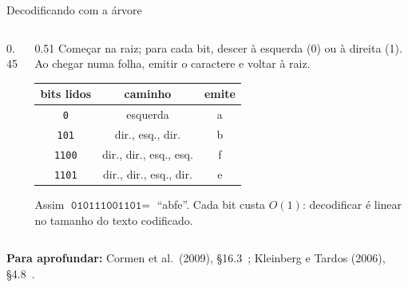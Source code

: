 \documentclass[aspectratio=169,xcolor=table]{beamer}
\newcommand{\zero}{edge from parent node[bit, left] {0}}
\newcommand{\um}{edge from parent node[bit, right] {1}}
\newcommand{\fonte}[1]{%
  \vfill
  {\tiny\color{gray!55!black}\textbf{Para aprofundar:} #1\par}%
}
\begin{document}
\begin{frame}{Decodificando com a árvore}
  \begin{columns}[c]
    \begin{column}{0.45\textwidth}
    \end{column}
    \begin{column}{0.51\textwidth}
      \scriptsize
      Começar na raiz; para cada bit, descer à esquerda (0) ou à direita (1). Ao chegar numa
      folha, emitir o caractere e voltar à raiz.
      \medskip

      \begin{center}
      \begin{tabular}{ccc}
        \toprule
        bits lidos & caminho & emite \\
        \midrule
        \texttt{0} & esquerda & a \\
        \texttt{101} & dir., esq., dir. & b \\
        \texttt{1100} & dir., dir., esq., esq. & f \\
        \texttt{1101} & dir., dir., esq., dir. & e \\
        \bottomrule
      \end{tabular}
      \end{center}
      \medskip
      Assim $\texttt{010111001101} =$ ``abfe''. Cada bit custa $O(1)$: decodificar é linear
      no tamanho do texto codificado.
    \end{column}
  \end{columns}
  \fonte{Cormen et al.\ (2009), \S 16.3~\cite{cormen2009introduction};
    Kleinberg e Tardos (2006), \S 4.8~\cite{kleinberg2006algorithm}.}
\end{frame}
\end{document}
